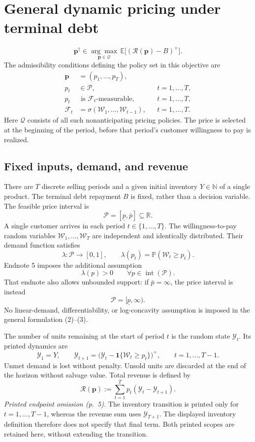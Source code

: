 \documentclass{article}
\begin{document}
\section*{General dynamic pricing under terminal debt}

\[
\mathbf p^{\dagger}\in
\underset{\mathbf p\in\mathcal Q}{\arg\max}\,
\mathbb E\bigl[(\mathcal R(\mathbf p)-B)^+\bigr].
\]
The admissibility conditions defining the policy set in this objective are
\[
\begin{aligned}
\mathbf p&=(p_1,\ldots,p_T),\\
p_t&\in\mathcal P, &&t=1,\ldots,T,\\
p_t&\text{ is }\mathcal F_t\text{-measurable}, &&t=1,\ldots,T,\\
\mathcal F_t&=\sigma(\mathcal W_1,\ldots,\mathcal W_{t-1}),
&&t=1,\ldots,T.
\end{aligned}
\]
Here \(\mathcal Q\) consists of all such nonanticipating pricing policies. The price is selected at the beginning of the period, before that period's customer willingness to pay is realized.

\subsection*{Fixed inputs, demand, and revenue}

There are \(T\) discrete selling periods and a given initial inventory \(Y\in\mathbb N\) of a single product. The terminal debt repayment \(B\) is fixed, rather than a decision variable. The feasible price interval is
\[
\mathcal P=[\underline p,\bar p]\subseteq\mathbb R.
\]
A single customer arrives in each period \(t\in\{1,\ldots,T\}\). The willingness-to-pay random variables \(\mathcal W_1,\ldots,\mathcal W_T\) are independent and identically distributed. Their demand function satisfies
\[
\lambda:\mathcal P\longrightarrow[0,1],
\qquad
\lambda(p_t)=\mathbb P(\mathcal W_t\ge p_t).
\]
Endnote 5 imposes the additional assumption
\[
\lambda(p)>0\qquad\forall p\in\operatorname{int}(\mathcal P).
\]
That endnote also allows unbounded support: if \(\bar p=\infty\), the price interval is instead
\[
\mathcal P=[\underline p,\infty).
\]
No linear-demand, differentiability, or log-concavity assumption is imposed in the general formulation (2)--(3).

The number of units remaining at the start of period \(t\) is the random state \(\mathcal Y_t\). Its printed dynamics are
\[
\mathcal Y_1=Y,\qquad
\mathcal Y_{t+1}
=\bigl(\mathcal Y_t-\mathbf 1\{\mathcal W_t\ge p_t\}\bigr)^+,
\qquad t=1,\ldots,T-1.
\]
Unmet demand is lost without penalty. Unsold units are discarded at the end of the horizon without salvage value. Total revenue is defined by
\[
\mathcal R(\mathbf p):=
\sum_{t=1}^{T}p_t(\mathcal Y_t-\mathcal Y_{t+1}).
\]
\emph{Printed endpoint omission (p.~5).} The inventory transition is printed only for \(t=1,\ldots,T-1\), whereas the revenue sum uses \(\mathcal Y_{T+1}\). The displayed inventory definition therefore does not specify that final term. Both printed scopes are retained here, without extending the transition.
\end{document}
